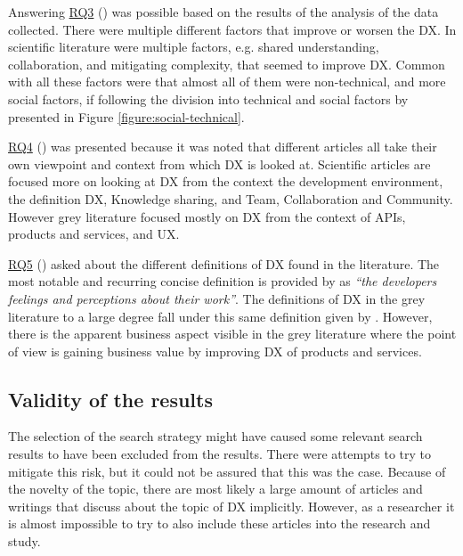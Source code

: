 \documentclass[english, 12pt, a4paper, sci, utf8, a-1b, online]{aaltothesis}
\begin{document}
Answering \hyperref[RQ3]{RQ3} (\rqthree) was possible based on the results of the analysis of the data collected. There were multiple different factors that improve or worsen the DX. In scientific literature were multiple factors, e.g. shared understanding, collaboration, and mitigating complexity, that seemed to improve DX. Common with all these factors were that almost all of them were non-technical, and more social factors, if following the division into technical and social factors by \textcite{fagerholm-doctoral-thesis} presented in Figure \ref{figure:social-technical}.

\hyperref[RQ4]{RQ4} (\rqfour) was presented because it was noted that different articles all take their own viewpoint and context from which DX is looked at. Scientific articles are focused more on looking at DX from the context the development environment, the definition DX, Knowledge sharing, and Team, Collaboration and Community. However grey literature focused mostly on DX from the context of APIs, products and services, and UX.

\hyperref[RQ5]{RQ5} (\rqfive) asked about the different definitions of DX found in the literature. The most notable and recurring concise definition is provided by \textcite{fagerholm-dx-concept-and-definition} as \textit{``the developers feelings and perceptions about their work''}. The definitions of DX in the grey literature to a large degree fall under this same definition given by \textcite{fagerholm-dx-concept-and-definition}. However, there is the apparent business aspect visible in the grey literature where the point of view is gaining business value by improving DX of products and services.

\subsection{Validity of the results}

The selection of the search strategy might have caused some relevant search results to have been excluded from the results. There were attempts to try to mitigate this risk, but it could not be assured that this was the case. Because of the novelty of the topic, there are most likely a large amount of articles and writings that discuss about the topic of DX implicitly. However, as a researcher it is almost impossible to try to also include these articles into the research and study.
\end{document}

